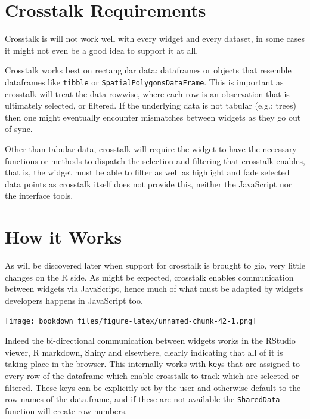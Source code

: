 \documentclass[
]{krantz}
\begin{document}
\hypertarget{linking-widgets-req}{%
\section{Crosstalk Requirements}\label{linking-widgets-req}}

Crosstalk is will not work well with every widget and every dataset, in some cases it might not even be a good idea to support it at all.

Crosstalk works best on rectangular data: dataframes or objects that resemble dataframes like \texttt{tibble} or \texttt{SpatialPolygonsDataFrame}. This is important as crosstalk will treat the data rowwise, where each row is an observation that is ultimately selected, or filtered. If the underlying data is not tabular (e.g.: trees) then one might eventually encounter mismatches between widgets as they go out of sync.

Other than tabular data, crosstalk will require the widget to have the necessary functions or methods to dispatch the selection and filtering that crosstalk enables, that is, the widget must be able to filter as well as highlight and fade selected data points as crosstalk itself does not provide this, neither the JavaScript nor the interface tools.

\hypertarget{linking-widgets-inner-workings}{%
\section{How it Works}\label{linking-widgets-inner-workings}}

As will be discovered later when support for crosstalk is brought to gio, very little changes on the R side. As might be expected, crosstalk enables communication between widgets via JavaScript, hence much of what must be adapted by widgets developers happens in JavaScript too.

\texttt{[image: bookdown\_files/figure-latex/unnamed-chunk-42-1.png]}

Indeed the bi-directional communication between widgets works in the RStudio viewer, R markdown, Shiny and elsewhere, clearly indicating that all of it is taking place in the browser. This internally works with \texttt{key}s that are assigned to every row of the dataframe which enable crosstalk to track which are selected or filtered. These keys can be explicitly set by the user and otherwise default to the row names of the data.frame, and if these are not available the \texttt{SharedData} function will create row numbers.
\end{document}
